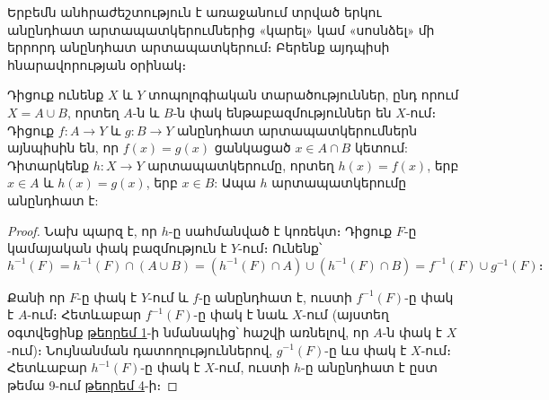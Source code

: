 \documentclass[./main.tex]{subfiles}
\begin{document}



\par Երբեմն անհրաժեշտություն է առաջանում տրված երկու անընդհատ ար\-տա\-պատ\-կե\-րում\-նե\-րից «կարել» կամ «սոսնձել» մի երրորդ անընդհատ ար\-տա\-պատ\-կե\-րում։ Բերենք այդպիսի հնարավորության օրինակ։

\begin{theorem}\label{ch11thm3}
Դիցուք ունենք $X$ և $Y$ տոպոլոգիական տարածություններ, ընդ \linebreak որում $X=A \cup B$, որտեղ $A$-ն և $B$-ն փակ ենթաբազմություններ են $X$-ում։ 
Դիցուք $f:A \rightarrow Y$ և $g:B \rightarrow Y$ անընդհատ արտապատկերումներն այնպիսին են, որ \linebreak $f(x)=g(x)$ ցանկացած $x \in A \cap   B$ կետում: Դիտարկենք $h:X \rightarrow Y$ արտապատկե\-րու\-մը, որտեղ $h(x)=f(x)$,  երբ $x \in A$ և $h(x)=g(x)$, երբ $x \in B$: Ապա $h$ արտա\-պատ\-կե\-րու\-մը անընդհատ է:
\end{theorem}
\begin{proof}
Նախ պարզ է, որ $h$-ը սահմանված է կոռեկտ։ Դիցուք $F$-ը կա\-մա\-յական փակ բազմություն է $Y$-ում։ Ունենք՝
\[ h^{-1} (F)= h^{-1} (F) \cap (A \cup B)=( h^{-1} (F) \cap A) \cup (h^{-1} (F) \cap B)=f^{-1}(F) \cup g^{-1} (F)։\]
\par Քանի որ $F$-ը փակ է $Y$-ում և $f$-ը անընդհատ է, ուստի $f^{-1} (F)$-ը փակ է $A\textrm{-ում}$։ Հետևաբար $f^{-1} (F)$-ը փակ է նաև $X$-ում (այստեղ օգտվեցինք \hyperref[թեորեմ 1]{թեորեմ 1}-ի նմանակից՝ հաշվի առնելով, որ $A$-ն փակ է $X$-ում)։ Նույնանման դա\-տո\-ղու\-թյուն\-նե\-րով, $g^{-1} (F)$-ը ևս փակ է $X$-ում։ Հետևաբար $h^{-1} (F)$-ը փակ է $X$-ում, ուստի $h$-ը անընդհատ է ըստ թեմա 9-ում \hyperref[ch9thm4]{թեորեմ 4}-ի։
\end{proof}
\end{document}
